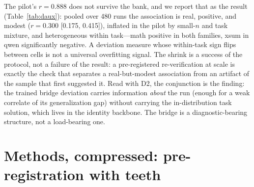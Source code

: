 \documentclass{article}
\begin{document}
The pilot's $r = 0.888$ does not survive the bank, and we report that as
the result (Table~\ref{tab:daux}): pooled over 480 runs the association is
real, positive, and modest ($r = 0.300$ [0.175, 0.415]), inflated in the
pilot by small-$n$ and task mixture, and heterogeneous within task---math
positive in both families, xsum in qwen significantly negative. A deviation
measure whose within-task sign flips between cells is not a universal
overfitting signal. The shrink is a success of the protocol, not a failure
of the result: a pre-registered re-verification at scale is exactly the
check that separates a real-but-modest association from an artifact of the
sample that first suggested it. Read with D2, the conjunction is the
finding: the trained bridge deviation carries information \emph{about} the
run (enough for a weak correlate of its generalization gap) without
carrying the in-distribution task solution, which lives in the identity
backbone. The bridge is a diagnostic-bearing structure, not a load-bearing
one.

\section{Methods, compressed: pre-registration with teeth}
\label{sec:methods}
\end{document}
